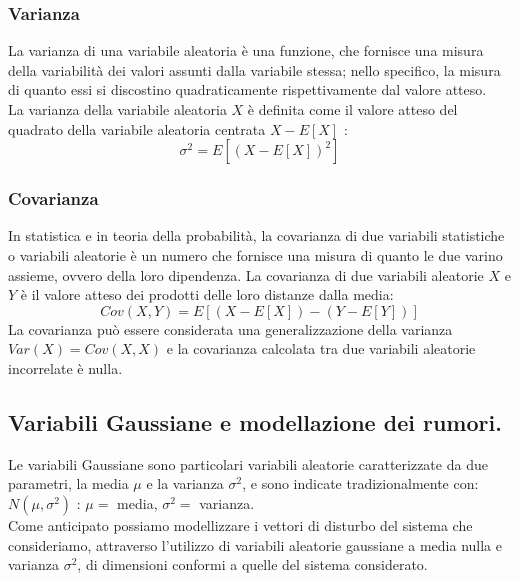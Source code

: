 \documentclass[12pt,a4paper]{article}
\begin{document}
\subsubsection{Varianza}

La varianza di una variabile aleatoria è una funzione, che fornisce una misura della variabilità dei valori assunti dalla variabile stessa; nello specifico, la misura di quanto essi si discostino quadraticamente rispettivamente dal valore atteso.\\


La varianza della variabile aleatoria $X$ è definita come il valore atteso del quadrato della variabile aleatoria centrata $X - E[X]$ :\[\sigma^2 = E[(X - E[X])^2]\]

\subsubsection{Covarianza}

In statistica e in teoria della probabilità, la covarianza di due variabili statistiche o variabili aleatorie è un numero che fornisce una misura di quanto le due varino assieme, ovvero della loro dipendenza.
La covarianza di due variabili aleatorie $X$ e $Y$ è il valore atteso dei prodotti delle loro distanze dalla media: \[Cov(X,Y)= E [(X-E[X])-(Y-E[Y])]\]
La covarianza può essere considerata una generalizzazione della varianza $Var(X) = Cov(X , X) $ e la covarianza calcolata tra due variabili aleatorie incorrelate è nulla.

\subsection{Variabili Gaussiane e modellazione dei rumori.}

Le variabili Gaussiane sono particolari variabili aleatorie caratterizzate da due parametri, la media $\mu$ e la varianza $\sigma^2$, e sono indicate tradizionalmente con: $N(\mu ,\sigma^2)$ : $\mu =$ media, $\sigma^2 =$ varianza.\\
Come anticipato possiamo modellizzare i vettori di disturbo del sistema che consideriamo, attraverso l’utilizzo di variabili aleatorie gaussiane a media nulla e varianza $\sigma^2$, di dimensioni conformi a quelle del sistema considerato.




 
\end{document}
